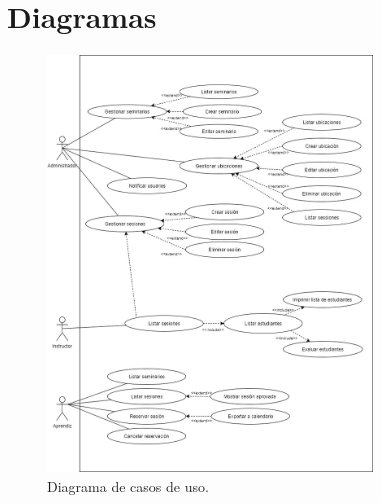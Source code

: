 
\chapter{Diagramas}

\begin{figure}[h]
	\begin{center}
		\includegraphics[width=0.77\textwidth]{figuras/diagramaCasosDeUso.jpg}
		\caption{Diagrama de casos de uso.} \label{fig:diagramaCasosDeUso}
	\end{center}
\end{figure}

